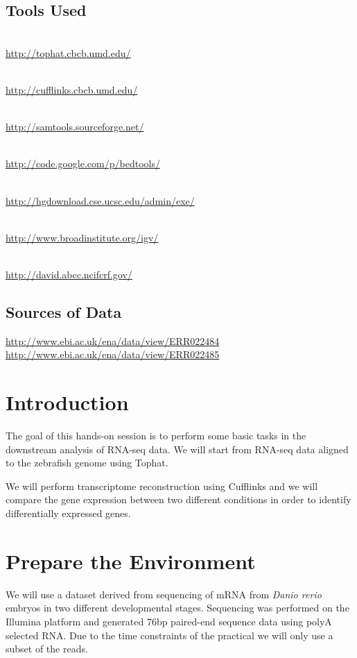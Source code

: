 \subsection{Tools Used}
\begin{description}[style=multiline,labelindent=0cm,align=left,leftmargin=1cm]
  \item[Tophat] \hfill\\
  	\url{http://tophat.cbcb.umd.edu/}
  \item[Cufflinks] \hfill\\
  	\url{http://cufflinks.cbcb.umd.edu/}
  \item[Samtools] \hfill\\
  	\url{http://samtools.sourceforge.net/}
  \item[BEDTools] \hfill\\
  	\url{http://code.google.com/p/bedtools/}
  \item[UCSC tools] \hfill\\
  	\url{http://hgdownload.cse.ucsc.edu/admin/exe/}
  \item[IGV] \hfill\\
  	\url{http://www.broadinstitute.org/igv/}
  \item[DAVID Functional Analysis] \hfill\\
  	\url{http://david.abcc.ncifcrf.gov/}
\end{description}

\subsection{Sources of Data}
\url{http://www.ebi.ac.uk/ena/data/view/ERR022484}\\
\url{http://www.ebi.ac.uk/ena/data/view/ERR022485}

\newpage

\section{Introduction}
The goal of this hands-on session is to perform some basic tasks in the
downstream analysis of RNA-seq data. We will start from RNA-seq data aligned to
the zebrafish genome using Tophat.

We will perform transcriptome reconstruction using Cufflinks and we will compare
the gene expression between two different conditions in order to identify
differentially expressed genes.

\section{Prepare the Environment}
We will use a dataset derived from sequencing of mRNA from \textit{Danio rerio} embryos
in two different developmental stages. Sequencing was performed on the Illumina
platform and generated 76bp paired-end sequence data using polyA selected RNA.
Due to the time constraints of the practical we will only use a subset of the
reads.

